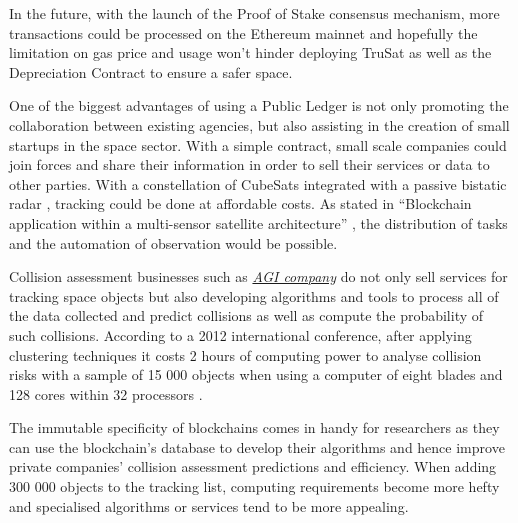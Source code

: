 \documentclass[conference]{IEEEtran}
\begin{document}
In the future, with the launch of the Proof of Stake consensus mechanism, more transactions could be processed on the Ethereum mainnet and hopefully the limitation on gas price and usage won't hinder deploying TruSat as well as the Depreciation Contract to ensure a safer space.

One of the biggest advantages of using a Public Ledger is not only promoting the collaboration between existing agencies, but also assisting in the creation of small startups in the space sector. With a simple contract, small scale companies could join forces and share their information in order to sell their services or data to other parties. With a constellation of CubeSats integrated with a passive bistatic radar \cite{CubesatPBR}, tracking could be done at affordable costs. As stated in ``Blockchain application within a multi-sensor satellite architecture'' \cite{BlockchainMultiSensor}, the distribution of tasks and the automation of observation would be possible.

Collision assessment businesses such as \href{https://www.agi.com/home}{\textit{AGI company}} do not only sell services for tracking space objects but also developing algorithms and tools to process all of the data collected and predict collisions as well as compute the probability of such collisions. According to a 2012 international conference, after applying clustering techniques it costs 2 hours of computing power to analyse collision risks with a sample of 15 000 objects when using a computer of eight blades and 128 cores within 32 processors \cite{ParallelComputing}.

 The immutable specificity of blockchains comes in handy for researchers as they can use the blockchain's database to develop their algorithms and hence improve private companies' collision assessment predictions and efficiency. When adding 300 000 objects to the tracking list, computing requirements become more hefty and specialised algorithms or services tend to be more appealing.



\end{document}
